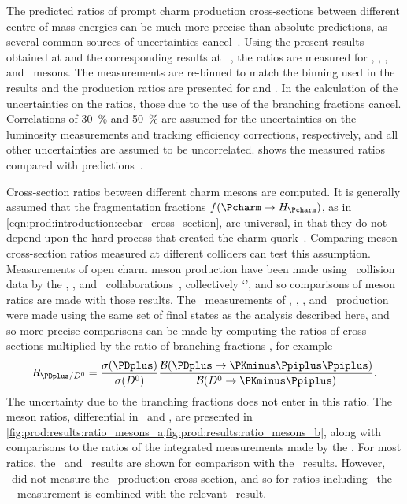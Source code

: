 The predicted ratios of prompt charm production cross-sections between
different centre-of-mass energies can be much more precise than absolute
predictions, as several common sources of uncertainties
cancel~\cite{Gauld:2015yia,Cacciari:2015fta,Kniehl:2012ti}.
Using the present results obtained at  and the corresponding
results at ~\cite{LHCb-PAPER-2012-041}, the ratios
 are measured for \PDzero, \PDplus, \PDsplus, and \PDstarp\
mesons.
The  measurements are re-binned to match the binning used in the
\sqrtseq{7} results and the production ratios are presented for 
and \yrange{2}{4.5}.
In the calculation of the uncertainties on the ratios, those due to the use of
the branching fractions cancel.
Correlations of \SI{30}{\percent} and \SI{50}{\percent} are assumed for the
uncertainties on the luminosity measurements and tracking efficiency
corrections, respectively, and all other uncertainties are assumed to be
uncorrelated.
 shows the measured ratios compared with
predictions~\cite{Gauld:2015yia,Cacciari:2015fta,Kniehl:2012ti}.

Cross-section ratios between different charm mesons are computed.
It is generally assumed that the fragmentation fractions $f(\cToHc)$, as in
\cref{eqn:prod:introduction:ccbar_cross_section}, are universal, in that they
do not depend upon the hard process that created the charm
quark~\cite{PDG2008,Lisovyi:2015uqa}.
Comparing meson cross-section ratios measured at different colliders can test
this assumption.
Measurements of open charm meson production have been made using \epem\
collision data by the \babar, \belle, and \cleo\
collaborations~\cite{Artuso:2004pj,Seuster:2005tr,Aubert:2002ue}, collectively
`\bfactories', and so comparisons of meson ratios are made with those results.
The \bfactory\ measurements of \PDzero, \PDplus, \PDsplus, and \PDstarp\
production were made using the same set of final states as the analysis
described here, and so more precise comparisons can be made by computing the
ratios of cross-sections multiplied by the ratio of branching fractions
\xsectimesbfrac, for example
\begin{equation*}
  \resultratio{\PDplus}{\PDzero} = \frac{%
    \xsec(\PDplus)
  }{%
    \xsec(\PDzero)
  }\frac{%
    \bfrac(\DpToKpipi)
  }{%
    \bfrac(\DzToKpi)
  }.
\end{equation*}
The uncertainty due to the branching fractions does not enter in this ratio.
The meson ratios, differential in \pT\ and \rapidity, are presented in
\cref{fig:prod:results:ratio_mesons_a,fig:prod:results:ratio_mesons_b}, along
with comparisons to the ratios of the integrated measurements made by the
\bfactories.
For most ratios, the \belle\ and \cleo\ results are shown for comparison with
the \lhcb\ results.
However, \cleo\ did not measure the \PDsplus\ production cross-section, and so
for ratios including \PDsplus\ the \babar\ \PDsplus\ measurement is combined
with the relevant \cleo\ result.

